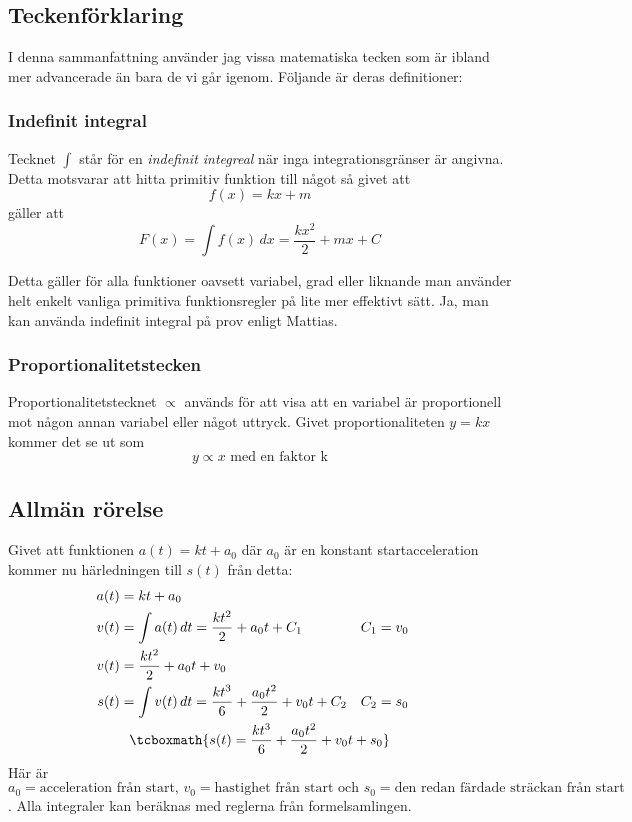 \subsection{Teckenförklaring}
I denna sammanfattning använder jag vissa matematiska tecken som är ibland mer advancerade än bara de vi går igenom. Följande är deras definitioner:

\subsubsection*{Indefinit integral}
\label{def:indefint}
Tecknet $\int$ står för en \emph{indefinit integreal} när inga integrationsgränser är angivna. Detta motsvarar att hitta primitiv funktion till något så givet att \[f(x) = kx + m\] gäller att
\begin{equation*}
    F(x) = \int{f(x)}\, dx = \frac{kx^2}{2} + mx + C
\end{equation*}

Detta gäller för alla funktioner oavsett variabel, grad eller liknande man använder helt enkelt vanliga primitiva funktionsregler på lite mer effektivt sätt. Ja, man kan använda indefinit integral på prov enligt Mattias.

\subsubsection*{Proportionalitetstecken}
\label{def:propto}
Proportionalitetstecknet $\propto$ används för att visa att en variabel är proportionell mot någon annan variabel eller något uttryck. Givet proportionaliteten $y=kx$ kommer det se ut som \[y \propto x \text{ med en faktor k}\] 

\subsection{Allmän rörelse}
\label{derive:allmänrörelse}
Givet att funktionen $a(t) = kt + a_0$ där $a_0$ är en konstant startacceleration kommer nu härledningen till $s(t)$ från detta:
\begin{gather*}
    \begin{aligned}
        \centering
        a(t) &= kt + a_0 \\
        v(t) &= \int{a(t)}\, dt = \frac{kt^2}{2} + a_0t + C_1 & C_1 &= v_0 \\
        v(t) &= \frac{kt^2}{2} + a_0t + v_0 \\
        s(t) &= \int{v(t)}\, dt = \frac{kt^3}{6} + \frac{a_0t^2}{2} + v_0t + C_2 & C_2 &= s_0
    \end{aligned} \\
    \tcboxmath{s(t) = \frac{kt^3}{6} + \frac{a_0t^2}{2} + v_0t + s_0}
\end{gather*}
\noindent Här är \(a_0 = \text{acceleration från start, } v_0 = \text{hastighet från start och } s_0 = \text{den redan färdade sträckan från start}\). Alla integraler kan beräknas med reglerna från formelsamlingen.

